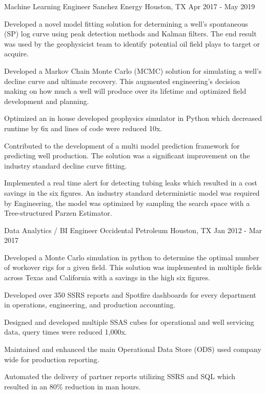 \begin{cventries}
\cventry
{Machine Learning Engineer} %
{Sanchez Energy} %
{Houston, TX} %
{Apr 2017 - May 2019} %
{ %
\begin{cvitems}
\item {Developed a novel model fitting solution for determining a well's spontaneous (SP) log curve using peak detection methods and Kalman filters. The end result was used by the geophysicist team to identify potential oil field plays to target or acquire.}
\item {Developed a Markov Chain Monte Carlo (MCMC) solution for simulating a well's decline curve and ultimate recovery. This augmented engineering's decision making on how much a well will produce over its lifetime and optimized field development and planning.}
\item {Optimized an in house developed geophysics simulator in Python which decreased runtime by 6x and lines of code were reduced 10x.}
\item {Contributed to the development of a multi model prediction framework for predicting well production. The solution was a significant improvement on the industry standard decline curve fitting.}
\item {Implemented a real time alert for detecting tubing leaks which resulted in a cost savings in the six figures. An industry standard deterministic model was required by Engineering, the model was optimized by sampling the search space with a Tree-structured Parzen Estimator.}
\end{cvitems}
}

\cventry
{Data Analytics / BI Engineer} %
{Occidental Petroleum} %
{Houston, TX} %
{Jan 2012 - Mar 2017} %
{
\begin{cvitems}
\item {Developed a Monte Carlo simulation in python to determine the optimal number of workover rigs for a given field. This solution was implemented in multiple fields across Texas and California with a savings in the high six figures.}
\item {Developed over 350 SSRS reports and Spotfire dashboards for every department in operations, engineering, and production accounting.}
\item {Designed and developed multiple SSAS cubes for operational and well servicing data, query times were reduced 1,000x.}
\item {Maintained and enhanced the main Operational Data Store (ODS) used company wide for production reporting.}
\item {Automated the delivery of partner reports utilizing SSRS and SQL which resulted in an 80\% reduction in man hours.}
\end{cvitems}
}

\end{cventries}
